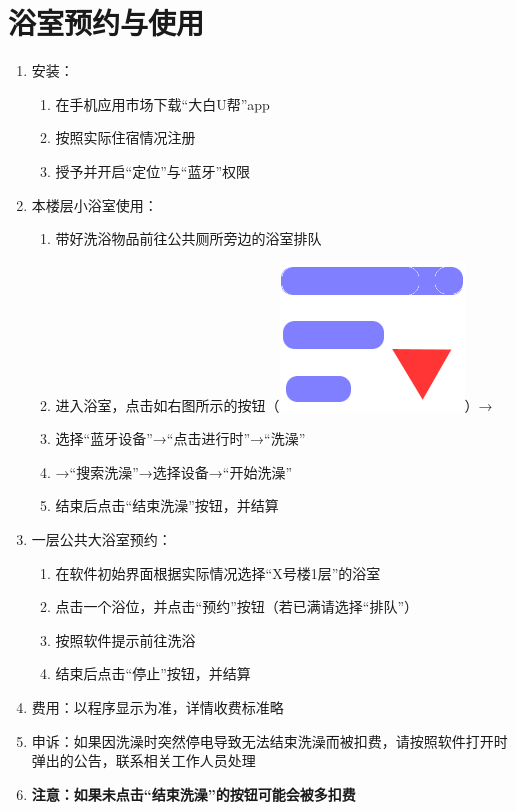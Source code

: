 \section[浴室预约与使用]{浴室预约与使用}
\begin{enumerate}
    \item 安装：
          \begin{enumerate}
              \item 在手机应用市场下载“大白U帮”app
              \item 按照实际住宿情况注册
              \item 授予并开启“定位”与“蓝牙”权限
          \end{enumerate}
    \item 本楼层小浴室使用：
          \begin{enumerate}
              \item 带好洗浴物品前往公共厕所旁边的浴室排队
              \item 进入浴室，点击如右图所示的按钮（\mbox{\includegraphics[height=2.4ex]{bath.png}}）→
              \item 选择“蓝牙设备”→“点击进行时”→“洗澡”
              \item →“搜索洗澡”\footnotemark →选择设备\footnotemark →“开始洗澡”
              \item 结束后点击“结束洗澡”按钮，并结算
          \end{enumerate}
    \item 一层公共大浴室预约：
          \begin{enumerate}
              \item 在软件初始界面根据实际情况选择“X号楼1层”的浴室
              \item 点击一个浴位，并点击“预约”按钮（若已满请选择“排队”）
              \item 按照软件提示前往洗浴
              \item 结束后点击“停止”按钮，并结算
          \end{enumerate}
    \item 费用：以程序显示为准，详情收费标准略
    \item 申诉：如果因洗澡时突然停电导致无法结束洗澡而被扣费，请按照软件打开时弹出的公告，联系相关工作人员处理
    \item \textbf{注意：如果未点击“结束洗澡”的按钮可能会被多扣费}
\end{enumerate}

